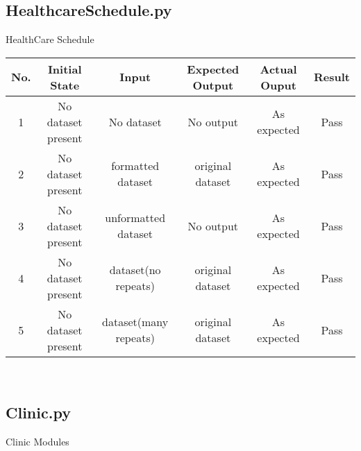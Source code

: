 \documentclass[12pt]{article}
\begin{document}

\quad

\quad

\quad



\subsection{HealthcareSchedule.py}


\vspace{-5pt}

HealthCare Schedule

\vspace{10pt}

\begin{tabular}{|c|c|c|c|c|c|}
\hline
\textbf{No.}  & \textbf{Initial State} & \textbf{Input} & \textbf{Expected Output} & \textbf{Actual Ouput} & \textbf{Result}
\\ \hline
1  & No dataset present & No dataset & No output & As expected & Pass
\\ \hline
2  & No dataset present & formatted dataset & original dataset & As expected & Pass
\\ \hline
3  & No dataset present & unformatted dataset & No output & As expected & Pass
\\ \hline
4  & No dataset present & dataset(no repeats) & original dataset & As expected & Pass
\\ \hline
5  & No dataset present & dataset(many repeats) & original dataset & As expected & Pass
\\ \hline
\end{tabular}\\





\quad

\quad

\quad



\subsection{Clinic.py}


\vspace{-5pt}

Clinic Modules

\vspace{10pt}
\end{document}
